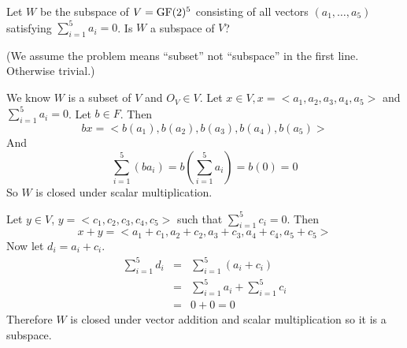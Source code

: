 \begin{problem}[Golan 81]

Let $W$ be the subspace of $V = \operatorname{GF}(2)^5$ consisting of all vectors 
$(a_1, \dots, a_5)$ satisfying $\sum_{i=1}^5 a_i = 0$.  Is $W$ a subspace of $V$?

\end{problem}
\smallskip
\begin{solution}
(We assume the problem means ``subset'' not ``subspace'' in the first line.  Otherwise trivial.)

We know $W$ is a subset of $V$ and $O_V \in V$. Let $x \in V, x = <a_1,a_2,a_3,a_4,a_5>$ and $\sum_{i=1}^{5}a_i = 0$. Let $b \in F$. Then 
$$bx = <b(a_1),b(a_2),b(a_3),b(a_4),b(a_5)>$$
And
$$\sum_{i=1}^{5}(ba_i) = b\left(\sum_{i=1}^{5}a_i\right) = b(0) = 0$$
So $W$ is closed under scalar multiplication.

Let $y \in V$, $y = <c_1,c_2,c_3,c_4,c_5>$ such that $\sum_{i=1}^{5}c_i = 0$.  Then
$$x+y = <a_1+c_1,a_2+c_2,a_3+c_3,a_4+c_4,a_5+c_5>$$
Now let $d_i = a_i + c_i$.
\begin{eqnarray*}
\sum_{i=1}^{5}d_i & = & \sum_{i=1}^{5}(a_i + c_i) \\
				  & = & \sum_{i=1}^{5}a_i + \sum_{i=1}^{5}c_i \\
				  & = & 0 + 0 = 0
\end{eqnarray*}
Therefore $W$ is closed under vector addition and scalar multiplication so it is a subspace.
\end{solution}
\probskip



